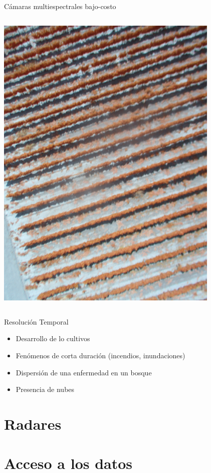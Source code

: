 \documentclass{beamer}
\begin{document}
\begin{frame}{Cámaras multiespectrales bajo-costo}
\begin{columns}
		\includegraphics[width=0.85\textwidth]{IMGs/ngb}
	\end{columns}
\end{frame}

\begin{frame}{Resolución Temporal}
	\begin{itemize}
		\item Desarrollo de lo cultivos
		\item Fenómenos de corta duración (incendios, inundaciones)
		\item Dispersión de una enfermedad en un bosque
		\item Presencia de nubes
	\end{itemize}
\end{frame}



\section{Radares}

\section{Acceso a los datos}
\end{document}
